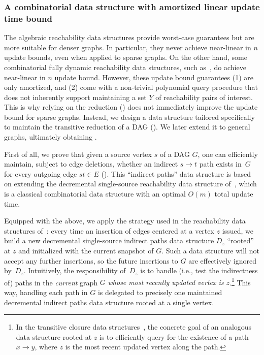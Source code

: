 \documentclass[11pt]{article}
\newcommand{\DAG}[1]{\textrm{{\normalfont DAG} \( #1 \)}\xspace}
\begin{document}
\subsubsection{A combinatorial data structure with amortized linear update time bound}
The algebraic reachability data structures provide worst-case guarantees but are more suitable for denser graphs.
In particular, they never achieve near-linear in $n$ update bounds, even when applied to sparse graphs.
On the other hand, some combinatorial fully dynamic reachability data structures, such as~\cite{RodittyZ08}, do achieve near-linear in $n$ update bound.
However, these update bound guarantees (1) are only amortized, and (2) come with a non-trivial polynomial query procedure that does not inherently support maintaining a set $Y$ of reachability pairs of interest.
This is why relying on the reduction () does not immediately improve the update bound for sparse graphs. 
Instead, we design a data structure tailored specifically to maintain the transitive reduction of a DAG ().
We later extend it to 
general graphs, ultimately obtaining .


First of all, we prove that
given a source vertex $s$ of a \DAG{G}, one can efficiently maintain, subject to edge deletions, whether an indirect $s\to t$ path 
exists in~$G$ for every outgoing edge $st\in E$ (). 
This ``indirect paths'' data structure 
is based on extending the decremental single-source
reachability data structure of~\cite{Italiano:1988aa}, which is a classical combinatorial data structure with an optimal $O(m)$ total update time.

Equipped with the above, we apply the strategy used in the reachability data structures of~\cite{RodittyZ08, Roditty:2016aa}: every time an insertion of edges centered at a vertex $z$ issued, we build a new decremental single-source indirect paths data structure $D_z$ ``rooted'' at $z$ and initialized with the current snapshot of $G$.
Such a data structure will not accept any further insertions, so the future insertions to $G$ are effectively ignored by~$D_z$.
Intuitively, the responsibility of~$D_z$ is to handle (i.e., test the indirectness of) paths in the \emph{current} graph $G$ \emph{whose most recently
updated vertex is $z$}.\footnote{In the transitive closure data structures~\cite{RodittyZ08, Roditty:2016aa},
the concrete goal of an analogous data structure rooted at $z$ is to efficiently query for the existence of a path $x\to y$, where \( z \) is the most recent updated vertex along the path.} 
This way, handling each path in $G$ is delegated to precisely one maintained
decremental indirect paths data structure rooted at a single vertex. 
\end{document}
